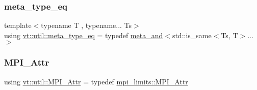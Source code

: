 \subsubsection{\texorpdfstring{meta\+\_\+type\+\_\+eq}{meta\_type\_eq}}
{\footnotesize\ttfamily template$<$typename T , typename... Ts$>$ \\
using \hyperlink{namespacevt_1_1util_aaa76da2983f12be56a31a96c017e8dd1}{vt\+::util\+::meta\+\_\+type\+\_\+eq} = typedef \hyperlink{structvt_1_1util_1_1meta__and}{meta\+\_\+and}$<$std\+::is\+\_\+same$<$Ts, T$>$...$>$}

\mbox{\label{namespacevt_1_1util_acdef825f3bbbffb020925d3ba6151df9}} 
\subsubsection{\texorpdfstring{M\+P\+I\+\_\+\+Attr}{MPI\_Attr}}
{\footnotesize\ttfamily using \hyperlink{namespacevt_1_1util_acdef825f3bbbffb020925d3ba6151df9}{vt\+::util\+::\+M\+P\+I\+\_\+\+Attr} = typedef \hyperlink{structvt_1_1util_1_1mpi__limits_1_1_m_p_i___attr}{mpi\+\_\+limits\+::\+M\+P\+I\+\_\+\+Attr}}

